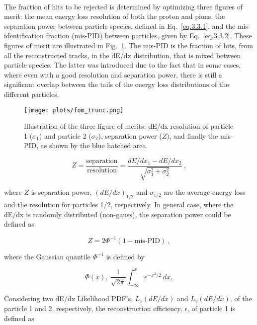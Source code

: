 ~\par The fraction of hits to be rejected is determined by optimizing three figures of merit: the mean energy loss resolution of both the proton and pions, the separation power between particle species, defined in Eq.~\ref{eq.3.3.1}, and the mis-identification fraction (mis-PID) between particles, given by Eq.~\ref{eq.3.3.2}. These figures of merit are illustrated in Fig.~\ref{fig.3.2.3}. The mis-PID is the fraction of hits, from all the reconstructed tracks, in the dE/dx distribution, that is mixed between particle species. The latter was introduced due to the fact that in some cases, where even with a good resolution and separation power, there is still a significant overlap between the tails of the energy loss distributions of the different particles.

\begin{figure}[H]
    \centering
    \texttt{[image: plots/fom\_trunc.png]}
    \caption{\label{fig.3.2.3} Illustration of the three figure of merits: dE/dx resolution of particle 1 ($\sigma_{1}$) and particle 2 ($\sigma_{2}$), separation power ($Z$), and finally the mis-PID, as shown by the blue hatched area.}
\end{figure}

\begin{equation}
    \label{eq.3.3.1}
    Z = \frac{\mathrm{separation}}{\mathrm{resolution}} = \frac{dE/dx_{1} - dE/dx_{2}}{\sqrt{\sigma_{1}^2 + \sigma_{2}^2}}~,
\end{equation}

\noindent where $Z$ is separation power, $(dE/dx)_{1/2}$ and $\sigma_{1/2}$ are the average energy loss and the resolution for particles 1/2, respectively. In general case, where the dE/dx is randomly distributed (non-gauss), the separation power could be defined as 

\begin{equation}
    \label{eq.3.3.2.0.1}
    Z = 2 \Phi^{-1}(1-\mbox{mis-PID})~,
\end{equation}

\noindent where the Gaussian quantile $\Phi^{-1}$ is defined by

\begin{equation}
    \label{eq.3.3.2.0.2}
    \Phi(x),~\frac{1}{\sqrt{2\pi}}\int_{-\infty}^{x} e^{-x^{2}/2}~dx,
\end{equation}

Considering two dE/dx Likelihood PDF's, $L_{1}(dE/dx)$ and $L_{2}(dE/dx)$, of the particle 1 and 2, respectively, the reconstruction efficiency, $\epsilon$, of particle 1 is defined as

